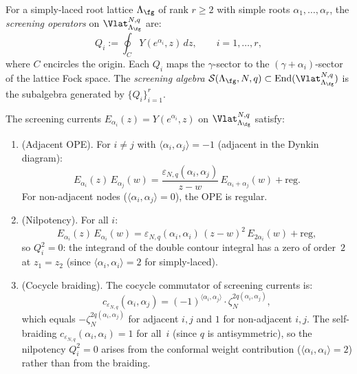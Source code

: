 \begin{construction}
\label{constr:lattice:screening}
For a simply-laced root lattice $\Lambda_\fg$ of rank $r \geq 2$
with simple roots $\alpha_1, \ldots, \alpha_r$, the
\emph{screening operators} on $\Vlat_{\Lambda_\fg}^{N,q}$ are:
\[
Q_i := \oint_C Y(e^{\alpha_i}, z)\, dz,
\qquad i = 1, \ldots, r,
\]
where $C$ encircles the origin. Each $Q_i$ maps the
$\gamma$-sector to the $(\gamma + \alpha_i)$-sector of the
lattice Fock space. The \emph{screening algebra}
$\mathcal{S}(\Lambda_\fg, N, q) \subset
\operatorname{End}(\Vlat_{\Lambda_\fg}^{N,q})$ is the
subalgebra generated by $\{Q_i\}_{i=1}^r$.
\end{construction}

\begin{proposition}
\label{prop:lattice:screening-structure}
The screening currents
$E_{\alpha_i}(z) = Y(e^{\alpha_i}, z)$ on
$\Vlat_{\Lambda_\fg}^{N,q}$ satisfy:
\begin{enumerate}[label=(\roman*)]
\item \textup{(}Adjacent OPE\textup{).}
 For $i \neq j$ with $\langle\alpha_i,\alpha_j\rangle = -1$
 \textup{(}adjacent in the Dynkin diagram\textup{)}:
 \[
 E_{\alpha_i}(z)\, E_{\alpha_j}(w)
 = \frac{\varepsilon_{N,q}(\alpha_i,\alpha_j)}{z - w}
 \,E_{\alpha_i+\alpha_j}(w) + \mathrm{reg}.
 \]
 For non-adjacent nodes
 ($\langle\alpha_i,\alpha_j\rangle = 0$),
 the OPE is regular.

\item \textup{(}Nilpotency\textup{).}
 For all $i$:
 \[
 E_{\alpha_i}(z)\, E_{\alpha_i}(w)
 = \varepsilon_{N,q}(\alpha_i,\alpha_i)\, (z-w)^2\,
 E_{2\alpha_i}(w) + \mathrm{reg},
 \]
 so $Q_i^2 = 0$: the integrand of the double contour integral
 has a zero of order~$2$ at $z_1 = z_2$
 \textup{(}since $\langle\alpha_i,\alpha_i\rangle = 2$ for
 simply-laced\textup{)}.

\item \textup{(}Cocycle braiding\textup{).}
 The cocycle commutator of screening currents is:
 \begin{equation}\label{eq:lattice:screening-braiding}
 c_{\varepsilon_{N,q}}(\alpha_i,\alpha_j)
 = (-1)^{\langle\alpha_i,\alpha_j\rangle}
 \cdot \zeta_N^{2q(\alpha_i,\alpha_j)},
 \end{equation}
 which equals $-\zeta_N^{2q(\alpha_i,\alpha_j)}$ for adjacent
 $i,j$ and $1$ for non-adjacent $i,j$.
 The self-braiding $c_{\varepsilon_{N,q}}(\alpha_i,\alpha_i) = 1$
 for all~$i$ \textup{(}since $q$ is antisymmetric\textup{)},
 so the nilpotency $Q_i^2 = 0$ arises from the conformal weight
 contribution \textup{(}$\langle\alpha_i,\alpha_i\rangle = 2$\textup{)}
 rather than from the braiding.
\end{enumerate}
\end{proposition}

